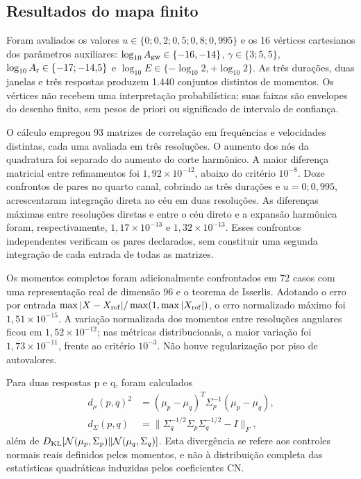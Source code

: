 \subsection{Resultados do mapa finito}
\label{sec:comp-mapa-resultados}

Foram avaliados os valores \(u\in\{0;0{,}2;0{,}5;0{,}8;0{,}995\}\)
e os 16 vértices cartesianos dos parâmetros auxiliares:
$\log_{10}A_{\rm gw}\in\{-16,-14\}$, $\gamma\in\{3;5{,}5\}$,
$\log_{10}A_{\rm r}\in\{-17;-14{,}5\}$ e
$\log_{10}E\in\{-\log_{10}2,+\log_{10}2\}$.
As três durações, duas janelas e três respostas produzem 1.440 conjuntos
distintos de momentos. Os vértices não recebem uma interpretação probabilística:
suas faixas são envelopes do desenho finito, sem pesos de priori ou significado
de intervalo de confiança.

O cálculo empregou 93 matrizes de correlação em frequências e velocidades
distintas, cada uma avaliada em três resoluções. O aumento dos nós da
quadratura foi separado do aumento do corte harmônico. A maior diferença
matricial entre refinamentos foi \(1{,}92\times10^{-12}\), abaixo do
critério \(10^{-8}\). Doze confrontos de pares no quarto canal, cobrindo
as três durações e \(u=0;0{,}995\), acrescentaram integração direta no céu
em duas resoluções. As diferenças máximas entre resoluções diretas e entre
o céu direto e a expansão harmônica foram, respectivamente,
\(1{,}17\times10^{-13}\) e \(1{,}32\times10^{-13}\).
Esses confrontos independentes verificam os pares declarados, sem constituir
uma segunda integração de cada entrada de todas as matrizes.

Os momentos completos foram adicionalmente confrontados em 72 casos com
uma representação real de dimensão 96 e o teorema de Isserlis. Adotando o erro por entrada
$\max|X-X_{\rm ref}|/\max(1,\max|X_{\rm ref}|)$,
o erro normalizado máximo foi \(1{,}51\times10^{-15}\). A variação normalizada
dos momentos entre resoluções angulares ficou em \(1{,}52\times10^{-12}\);
nas métricas distribucionais, a maior variação foi
\(1{,}73\times10^{-11}\), frente ao critério \(10^{-3}\).
Não houve regularização por piso de autovalores.

Para duas respostas p e q, foram calculados
\begin{align}
 d_\mu(p,q)^2&=(\mu_p-\mu_q)^T\Sigma_p^{-1}(\mu_p-\mu_q),\nonumber\\
 d_\Sigma(p,q)&=\|\Sigma_q^{-1/2}\Sigma_p\Sigma_q^{-1/2}-I\|_F,
 \label{eq:comp-metricas-mapa}
\end{align}
além de \(D_{\rm KL}[\mathcal N(\mu_p,\Sigma_p)\Vert
\mathcal N(\mu_q,\Sigma_q)]\). Esta divergência se refere aos controles
normais reais definidos pelos momentos, e não à distribuição completa das
estatísticas quadráticas induzidas pelos coeficientes CN.

